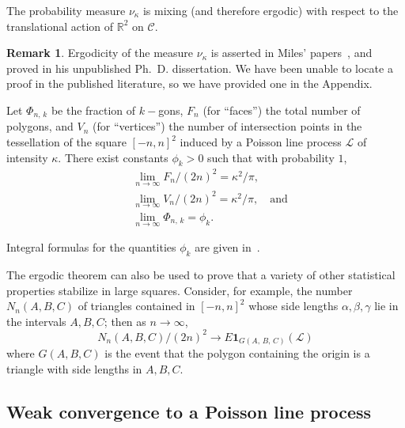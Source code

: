 \documentclass[10pt]{amsart}
\theoremstyle{definition}\newtheorem{defi}[theo]{Definition}\newtheorem{rema}[theo]{Remark}\newtheorem{exam}[theo]{Example}\newtheorem{exem}[theo]{Example}\newtheorem{nota}[theo]{Notation}
\newcommand{\zz}[1]{\mathbb #1}
\begin{document}
\begin{prop}\label{proposition:ergodicity-plp}
The probability measure $\nu_{\kappa}$ is mixing (and therefore ergodic) with respect to the translational action of $\zz{R}^{2}$ on $\mathcal{C}$.
\end{prop}

\begin{rema}\label{remark:kendall}
Ergodicity of the measure $\nu_{\kappa}$ is asserted in Miles' papers~\cite{miles:pnas1,miles:pnas2}, and proved in his unpublished Ph.~D. dissertation. We have been unable to locate a proof in the published literature, so we have provided one in the Appendix.
\end{rema}

\begin{coro}\label{corollary:poly-freqs}
Let $\Phi _{n,\,k}$ be the fraction of $k-$gons, $F_{n}$ (for ``faces'') the total number of polygons, and $V_{n}$ (for ``vertices'') the number of intersection points in the tessellation of the square $[-n,n]^{2}$ induced by a Poisson line process $\mathcal{L}$ of intensity $\kappa$. There exist constants $\phi _{k}>0$ such that with probability $1$,
\begin{align}\label{eq:poly-freqs}
&\lim_{n \rightarrow \infty} F_{n}/ (2n)^{2}=\kappa^{2} /\pi,\\\label{eq:vertex-freqs}
&\lim_{n \rightarrow \infty} V_{n}/ (2n)^{2}=\kappa^{2}/\pi, \quad \text{and}\\\label{eq:kgonFracs}
&\lim_{n \rightarrow \infty} \Phi _{n,\,k}=\phi _{k}.
\end{align}
\end{coro}

Integral formulas for the quantities $\phi_k$ are given in~\cite{Calka}.

The ergodic theorem can also be used to prove that a variety of other statistical properties stabilize in large squares. Consider, for example, the number $N_{n} (A,B,C)$ of triangles contained in $[-n,n]^{2}$ whose side lengths $\alpha,\beta,\gamma$ lie in the intervals $A,B,C$; then as $n
\rightarrow \infty$,
\[
N_{n} (A,B,C)/ (2n)^{2} \longrightarrow E \mathbf{1}_{G (A,\,B,\,C)} (\mathcal{L})
\]
where $G (A,B,C)$ is the event that the polygon containing the origin is a triangle with side lengths in $A,B,C$.


\subsection{Weak convergence to a Poisson line process}\label{ssec:poissonApprox}
\end{document}
